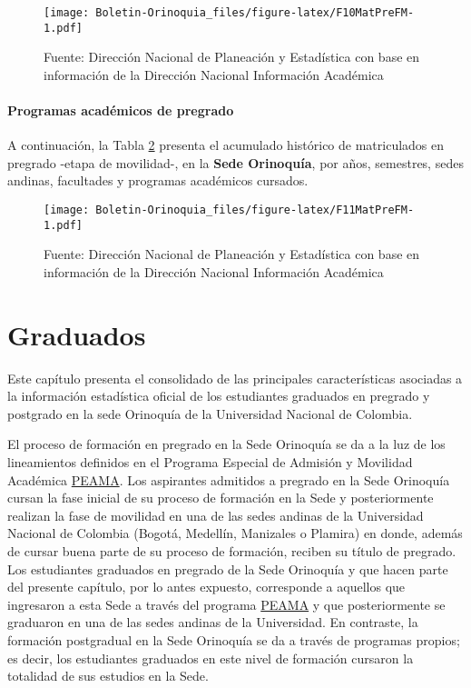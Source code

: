 \documentclass[
]{book}
\begin{document}
\begin{figure}
\centering
\texttt{[image: Boletin-Orinoquia\_files/figure-latex/F10MatPreFM-1.pdf]}
\caption{\label{fig:F10MatPreFM}Fuente: Dirección Nacional de Planeación y Estadística con base en información de la Dirección Nacional Información Académica}
\end{figure}

\hypertarget{programas-acaduxe9micos-de-pregrado-3}{%
\subsubsection{Programas académicos de pregrado}\label{programas-acaduxe9micos-de-pregrado-3}}

A continuación, la Tabla \ref{fig:F11MatPreFM} presenta el acumulado histórico de matriculados en pregrado -etapa de movilidad-, en la \textbf{Sede Orinoquía}, por años, semestres, sedes andinas, facultades y programas académicos cursados.

\begin{figure}
\centering
\texttt{[image: Boletin-Orinoquia\_files/figure-latex/F11MatPreFM-1.pdf]}
\caption{\label{fig:F11MatPreFM}Fuente: Dirección Nacional de Planeación y Estadística con base en información de la Dirección Nacional Información Académica}
\end{figure}

\hypertarget{Grad}{%
\chapter{Graduados}\label{Grad}}

Este capítulo presenta el consolidado de las principales características asociadas a la información estadística oficial de los estudiantes graduados en pregrado y postgrado en la sede Orinoquía de la Universidad Nacional de Colombia.

El proceso de formación en pregrado en la Sede Orinoquía se da a la luz de los lineamientos definidos en el Programa Especial de Admisión y Movilidad Académica \protect\hyperlink{peama}{PEAMA}. Los aspirantes admitidos a pregrado en la Sede Orinoquía cursan la fase inicial de su proceso de formación en la Sede y posteriormente realizan la fase de movilidad en una de las sedes andinas de la Universidad Nacional de Colombia (Bogotá, Medellín, Manizales o Plamira) en donde, además de cursar buena parte de su proceso de formación, reciben su título de pregrado. Los estudiantes graduados en pregrado de la Sede Orinoquía y que hacen parte del presente capítulo, por lo antes expuesto, corresponde a aquellos que ingresaron a esta Sede a través del programa \protect\hyperlink{peama}{PEAMA} y que posteriormente se graduaron en una de las sedes andinas de la Universidad. En contraste, la formación postgradual en la Sede Orinoquía se da a través de programas propios; es decir, los estudiantes graduados en este nivel de formación cursaron la totalidad de sus estudios en la Sede.
\end{document}
